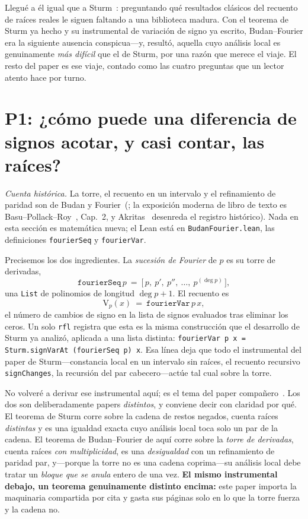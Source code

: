 \documentclass[11pt]{article}
\newcommand{\lean}[1]{\texttt{#1}}
\newcommand{\V}{\mathrm{V}}
\begin{document}
Llegu\'e a \'el igual que a Sturm~\cite{sturmlean}: preguntando qu\'e resultados cl\'asicos del
recuento de ra\'ices reales le siguen faltando a una biblioteca madura. Con el teorema de Sturm ya
hecho y su instrumental de variaci\'on de signo ya escrito, Budan--Fourier era la siguiente ausencia
conspicua---y, result\'o, aquella cuyo an\'alisis local es genuinamente \emph{m\'as dif\'icil} que el
de Sturm, por una raz\'on que merece el viaje. El resto del paper es ese viaje, contado como las
cuatro preguntas que un lector atento hace por turno.

\section{P1: ¿c\'omo puede una diferencia de signos acotar, y casi contar, las ra\'ices?}\label{sec:q1}

\emph{Cuenta hist\'orica.} La torre, el recuento en un intervalo y el refinamiento de paridad son de
Budan y Fourier~(\cite{budan,fourier}; la exposici\'on moderna de libro de texto es
Basu--Pollack--Roy~\cite{bpr}, Cap.~2, y Akritas~\cite{akritas} desenreda el registro hist\'orico).
Nada en esta secci\'on es matem\'atica nueva; el Lean est\'a en \lean{BudanFourier.lean}, las
definiciones \lean{fourierSeq} y \lean{fourierVar}.

Precisemos los dos ingredientes. La \emph{sucesi\'on de Fourier} de $p$ es su torre de derivadas,
\[
  \lean{fourierSeq}\,p\ =\ \big[\,p,\ p',\ p'',\ \dots,\ p^{(\deg p)}\,\big],
\]
una \lean{List} de polinomios de longitud $\deg p + 1$. El recuento es
\[
  \V_p(x)\ =\ \lean{fourierVar}\,p\,x,
\]
el n\'umero de cambios de signo en la lista de signos evaluados tras eliminar los ceros. Un solo
\lean{rfl} registra que esta es la misma construcci\'on que el desarrollo de Sturm ya analiz\'o,
aplicada a una lista distinta: \lean{fourierVar p x = Sturm.signVarAt (fourierSeq p) x}. Esa l\'inea
deja que todo el instrumental del paper de Sturm---constancia local en un intervalo sin ra\'ices, el
recuento recursivo \lean{signChanges}, la recursi\'on del par cabecero---act\'ue tal cual sobre la
torre.

No volver\'e a derivar ese instrumental aqu\'i; es el tema del paper compa\~nero~\cite{sturmlean}. Los
dos son deliberadamente papers \emph{distintos}, y conviene decir con claridad por qu\'e. El teorema
de Sturm corre sobre la cadena de restos negados, cuenta ra\'ices \emph{distintas} y es una igualdad
exacta cuyo an\'alisis local toca solo un par de la cadena. El teorema de Budan--Fourier de aqu\'i
corre sobre la \emph{torre de derivadas}, cuenta ra\'ices \emph{con multiplicidad}, es una
\emph{desigualdad} con un refinamiento de paridad par, y---porque la torre no es una cadena
coprima---su an\'alisis local debe tratar un \emph{bloque que se anula} entero de una vez.
\textbf{El mismo instrumental debajo, un teorema genuinamente distinto encima:} este paper importa la
maquinaria compartida por cita y gasta sus p\'aginas solo en lo que la torre fuerza y la cadena no.
\end{document}
